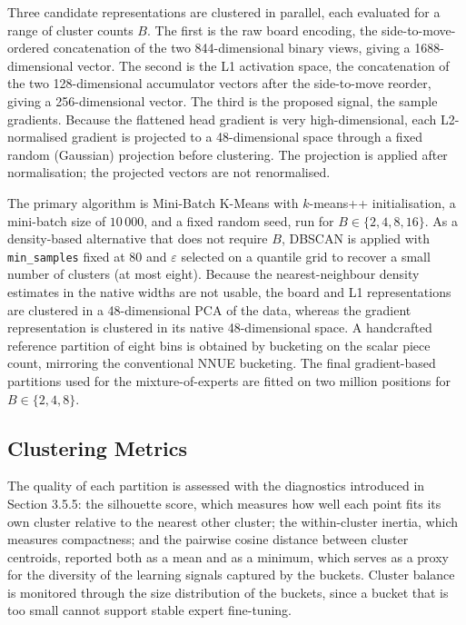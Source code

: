 Three candidate representations are clustered in parallel, each evaluated for a range of cluster counts $B$. The first is the raw board encoding, the side-to-move-ordered concatenation of the two 844-dimensional binary views, giving a 1688-dimensional vector. The second is the L1 activation space, the concatenation of the two 128-dimensional accumulator vectors after the side-to-move reorder, giving a 256-dimensional vector. The third is the proposed signal, the sample gradients. 
Because the flattened head gradient is very high-dimensional, each L2-normalised gradient is projected to a 48-dimensional space through a fixed random (Gaussian) projection before clustering. The projection is applied after normalisation; the projected vectors are not renormalised.

The primary algorithm is Mini-Batch K-Means with $k$-means++ initialisation, a mini-batch size of $10\,000$, and a fixed random seed, run for $B \in \{2, 4, 8, 16\}$. As a density-based alternative that does not require $B$, DBSCAN is applied with \texttt{min\_samples} fixed at $80$ and $\varepsilon$ selected on a quantile grid to recover a small number of clusters (at most eight). Because the nearest-neighbour density estimates in the native widths are not usable, the board and L1 representations are clustered in a 48-dimensional PCA of the data, whereas the gradient representation is clustered in its native 48-dimensional space. A handcrafted reference partition of eight bins is obtained by bucketing on the scalar piece count, mirroring the conventional NNUE bucketing. The final gradient-based partitions used for the mixture-of-experts are fitted on two million positions for $B \in \{2, 4, 8\}$.

\subsection{Clustering Metrics}

The quality of each partition is assessed with the diagnostics introduced in Section 3.5.5: the silhouette score, which measures how well each point fits its own cluster relative to the nearest other cluster; the within-cluster inertia, which measures compactness; and the pairwise cosine distance between cluster centroids, reported both as a mean and as a minimum, which serves as a proxy for the diversity of the learning signals captured by the buckets. Cluster balance is monitored through the size distribution of the buckets, since a bucket that is too small cannot support stable expert fine-tuning.


